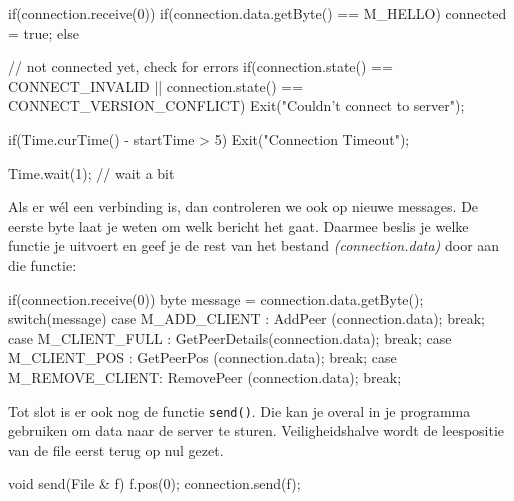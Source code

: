 \begin{code}
if(connection.receive(0))
{
	if(connection.data.getByte() == M_HELLO) connected = true;
} else
{
	// not connected yet, check for errors
	if(connection.state() == CONNECT_INVALID || connection.state() == CONNECT_VERSION_CONFLICT)
	{
		 Exit("Couldn't connect to server");
	}
	
	if(Time.curTime() - startTime > 5)
	{
		 Exit("Connection Timeout");
	}
	
	Time.wait(1); // wait a bit
}
\end{code}

Als er w\'el een verbinding is, dan controleren we ook op nieuwe messages. De eerste byte laat je weten om welk bericht het gaat. Daarmee beslis je welke functie je uitvoert en geef je de rest van het bestand \textsl{(connection.data)} door aan die functie:

\begin{code}
if(connection.receive(0))
{
	byte message = connection.data.getByte();
	switch(message)
	{
		 case M_ADD_CLIENT   : AddPeer       (connection.data); break;            
		 case M_CLIENT_FULL  : GetPeerDetails(connection.data); break;               
		 case M_CLIENT_POS   : GetPeerPos    (connection.data); break;              
		 case M_REMOVE_CLIENT: RemovePeer    (connection.data); break;
	}
}
\end{code}

Tot slot is er ook nog de functie \texttt{send()}. Die kan je overal in je programma gebruiken om data naar de server te sturen. Veiligheidshalve wordt de leespositie van de file eerst terug op nul gezet.

\begin{code}
void send(File & f)
{
   f.pos(0); 
   connection.send(f);
}
\end{code}

